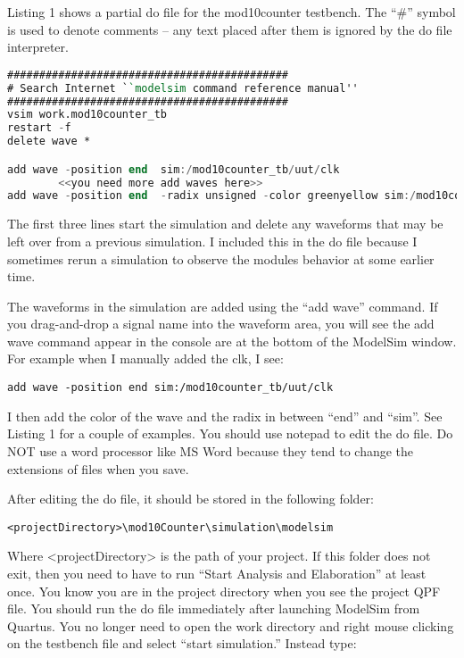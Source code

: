 Listing 1 shows a partial do file for the mod10counter testbench. The
``\#'' symbol is used to denote comments -- any text placed after them
is ignored by the do file interpreter.


\begin{lstlisting}[language=Verilog,
 caption={A partial do file for the mod10counter.},
basicstyle=\tiny\ttfamily,
 label={listing:mod10Counter},
 frame=single]
############################################
# Search Internet ``modelsim command reference manual''
############################################
vsim work.mod10counter_tb
restart -f
delete wave *

add wave -position end  sim:/mod10counter_tb/uut/clk
		<<you need more add waves here>>
add wave -position end  -radix unsigned -color greenyellow sim:/mod10counter_tb/uut/currentCount
 \end{lstlisting}
 
The first three lines start the simulation and delete any waveforms that
may be left over from a previous simulation. I included this in the do
file because I sometimes rerun a simulation to observe the modules
behavior at some earlier time.

The waveforms in the simulation are added using the ``add wave''
command. If you drag-and-drop a signal name into the waveform area, you
will see the add wave command appear in the console are at the bottom of
the ModelSim window. For example when I manually added the clk, I see:

\begin{verbatim}
add wave -position end sim:/mod10counter_tb/uut/clk
\end{verbatim}

I then add the color of the wave and the radix in between ``end'' and
``sim''. See Listing 1 for a couple of examples. You should use notepad
to edit the do file. Do NOT use a word processor like MS Word because
they tend to change the extensions of files when you save.

After editing the do file, it should be stored in the following folder:

\begin{verbatim}
<projectDirectory>\mod10Counter\simulation\modelsim
\end{verbatim}

Where \textless projectDirectory\textgreater{} is the path of your
project. If this folder does not exit, then you need to have to run
``Start Analysis and Elaboration'' at least once. You know you are in
the project directory when you see the project QPF file. You should run
the do file immediately after launching ModelSim from Quartus. You no
longer need to open the work directory and right mouse clicking on the
testbench file and select ``start simulation.'' Instead type:

